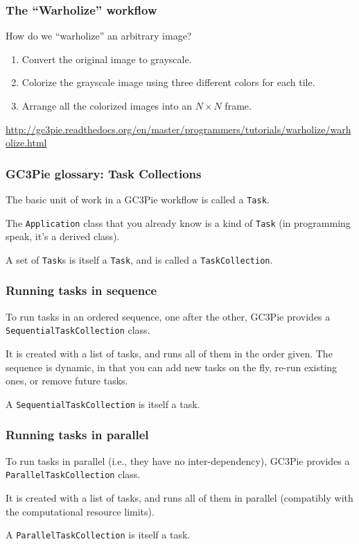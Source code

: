 \documentclass[english,serif,mathserif,usenames,dvipsnames]{beamer}
\begin{document}
\begin{frame}[label=workflows]
  \frametitle{The ``Warholize'' workflow}
How do we ``warholize'' an arbitrary image?

\+
\begin{enumerate}
\item Convert the original image to grayscale.
\item Colorize the grayscale image using three different colors for each tile.
\item Arrange all the colorized images into an $N\times N$ frame.
\end{enumerate}

\+
\begin{references}
  \url{http://gc3pie.readthedocs.org/en/master/programmers/tutorials/warholize/warholize.html}
\end{references}
\end{frame}


\begin{frame}
  \frametitle{GC3Pie glossary: Task Collections}

  The basic unit of work in a GC3Pie workflow is called a \texttt{Task}.

  \+
  The \texttt{Application} class that you already know is a kind of
  \texttt{Task} (in programming speak, it's a derived class).

  \+
  A set of \texttt{Task}s is itself a \texttt{Task}, and is called a \texttt{TaskCollection}.
\end{frame}


\begin{frame}
  \frametitle{Running tasks in sequence}

  To run tasks in an ordered sequence, one after the other, GC3Pie
  provides a \texttt{SequentialTaskCollection} class.

  \+
  It is created with a list of tasks, and runs all of them in the
  order given.  The sequence is dynamic, in that you can add new tasks
  on the fly, re-run existing ones, or remove future tasks.

  \+
  A \texttt{SequentialTaskCollection} is itself a task.
\end{frame}


\begin{frame}
  \frametitle{Running tasks in parallel}

  To run tasks in parallel (i.e., they have no inter-dependency),
  GC3Pie provides a \texttt{ParallelTaskCollection} class.

  \+
  It is created with a list of tasks, and runs all of them
  in parallel (compatibly with the computational resource limits).

  \+
  A \texttt{ParallelTaskCollection} is itself a task.

\end{frame}
\end{document}
